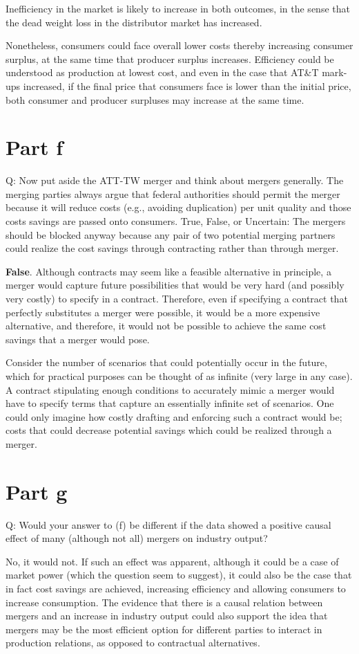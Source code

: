 \documentclass[12pt]{paper}
\begin{document}
Inefficiency in the market is likely to increase in both outcomes, in
the sense that the dead weight loss in the distributor market has
increased.


Nonetheless, consumers could face overall lower costs thereby
increasing consumer surplus, at the same time that producer surplus
increases. Efficiency could be understood as production at lowest
cost, and even in the case that AT\&T mark-ups increased, if the final
price that consumers face is lower than the initial price, both
consumer and producer surpluses may increase at the same time.


\section*{Part f}
Q: Now put aside the ATT-TW merger and think about mergers
generally. The merging parties always argue that federal authorities
should permit the merger because it will reduce costs (e.g., avoiding
duplication) per unit quality and those costs savings are passed onto
consumers. True, False, or Uncertain: The mergers should be blocked
anyway because any pair of two potential merging partners could
realize the cost savings through contracting rather than through
merger.


\textbf{False}. Although contracts may seem like a feasible
alternative in principle, a merger would capture future possibilities
that would be very hard (and possibly very costly) to specify in a
contract. Therefore, even if specifying a contract that perfectly
substitutes a merger were possible, it would be a more expensive
alternative, and therefore, it would not be possible to achieve the
same cost savings that a merger would pose.


Consider the number of scenarios that could potentially occur in the
future, which for practical purposes can be thought of as infinite
(very large in any case). A contract stipulating enough conditions to
accurately mimic a merger would have to specify terms that capture an
essentially infinite set of scenarios. One could only imagine how
costly drafting and enforcing such a contract would be; costs that
could decrease potential savings which could be realized through a
merger.

\section*{Part g}
Q: Would your answer to (f) be different if the data showed a positive
causal effect of many (although not all) mergers on industry output?


No, it would not. If such an effect was apparent, although it could be
a case of market power (which the question seem to suggest), it could
also be the case that in fact cost savings are achieved, increasing
efficiency and allowing consumers to increase consumption. The
evidence that there is a causal relation between mergers and an
increase in industry output could also support the idea that mergers
may be the most efficient option for different parties to interact in
production relations, as opposed to contractual alternatives.
\end{document}
